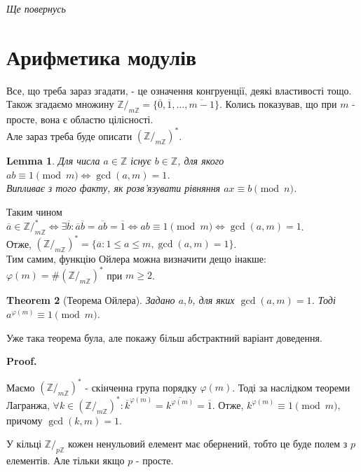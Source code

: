\documentclass[a4paper, 10pt]{article}
\makeatletter
\theoremstyle{theoremdd}
\newtheorem{theorem}{Theorem}[subsection]
\theoremstyle{theoremdd}
\theoremstyle{theoremdd}
\theoremstyle{theoremdd}
\theoremstyle{theoremdd}
\theoremstyle{theoremdd}
\theoremstyle{theoremdd}
\newtheorem{lemma}[theorem]{Lemma}
\theoremstyle{theoremdd}
\renewenvironment{proof}[1][Proof.\\]{\par
\pushQED{\hfill \qed}%
\normalfont \topsep6\p@\@plus6\p@\relax
\trivlist
\item\relax
{\bfseries
#1\@addpunct{.}}\hspace\labelsep\ignorespaces
}{%
\popQED\endtrivlist\@endpefalse
}
\makeatother
\begin{document}
\textit{Ще повернусь}
\newpage

\section{Арифметика модулів}
Все, що треба зараз згадати, - це означення конгруенції, деякі властивості тощо.\\
Також згадаємо множину $\mathbb{Z}/_{m \mathbb{Z}} = \{  \overline{0}, \overline{1}, \dots, \overline{m-1} \}$. Колись показував, що при $m$ - просте, вона є областю цілісності.\\
Але зараз треба буде описати $(\mathbb{Z}/_{m \mathbb{Z}})^*$.

\begin{lemma}
Для числа $a \in \mathbb{Z}$ існує $b \in \mathbb{Z}$, для якого $ab \equiv 1 \pmod m \iff \gcd(a,m) = 1$.\\
\textit{Випливає з того факту, як розв'язувати рівняння $ax \equiv b \pmod n$.}
\end{lemma}

Таким чином $\overline{a} \in \mathbb{Z}/_{m \mathbb{Z}}^* \iff \exists \overline{b}: \overline{a} \overline{b} = \overline{ab} = \overline{1} \iff ab \equiv 1 \pmod m \iff \gcd(a,m)=1$.\\
Отже, $(\mathbb{Z}/_{m\mathbb{Z}})^* = \{ \overline{a}: 1 \leq a \leq m, \gcd (a,m) = 1 \}$.
\bigskip \\
Тим самим, функцію Ойлера можна визначити дещо інакше:\\
$\varphi(m) = \#(\mathbb{Z}/_{m\mathbb{Z}})^*$ при $m \geq 2$.

\begin{theorem}[Теорема Ойлера]
Задано $a,b$, для яких $\gcd(a,m)=1$. Тоді $a^{\varphi(m)} \equiv 1 \pmod m$.
\end{theorem}
Уже така теорема була, але покажу більш абстрактний варіант доведення.

\begin{proof}
Маємо $(\mathbb{Z}/_{m \mathbb{Z}})^*$ - скінченна група порядку $\varphi(m)$. Тоді за наслідком теореми Лагранжа, $\forall k \in (\mathbb{Z}/_{m \mathbb{Z}})^*: \overline{k}^{\varphi(m)} = \overline{k^{\varphi(m)}} = \overline{1}$. Отже, $k^{\varphi(m)} \equiv 1 \pmod m$, причому $\gcd(k,m)=1$.
\end{proof}

У кільці $\mathbb{Z}/_{p \mathbb{Z}}$ кожен ненульовий елемент має обернений, тобто це буде полем з $p$ елементів. Але тільки якщо $p$ - просте.
\end{document}
